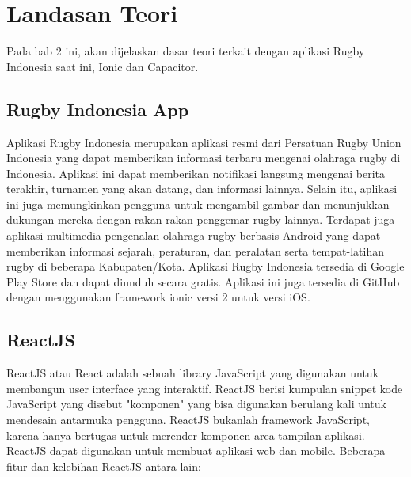 \chapter{Landasan Teori}
\label{chap:teori}

Pada bab 2 ini, akan dijelaskan dasar teori terkait dengan aplikasi Rugby Indonesia saat ini, Ionic dan Capacitor. 

\section{Rugby Indonesia App}
\label{sec:skripsi} 
    Aplikasi Rugby Indonesia merupakan aplikasi resmi dari Persatuan Rugby Union Indonesia yang dapat memberikan informasi terbaru mengenai olahraga rugby di Indonesia. Aplikasi ini dapat memberikan notifikasi langsung mengenai berita terakhir, turnamen yang akan datang, dan informasi lainnya. Selain itu, aplikasi ini juga memungkinkan pengguna untuk mengambil gambar dan menunjukkan dukungan mereka dengan rakan-rakan penggemar rugby lainnya. Terdapat juga aplikasi multimedia pengenalan olahraga rugby berbasis Android yang dapat memberikan informasi sejarah, peraturan, dan peralatan serta tempat-latihan rugby di beberapa Kabupaten/Kota. Aplikasi Rugby Indonesia tersedia di Google Play Store dan dapat diunduh secara gratis. Aplikasi ini juga tersedia di GitHub dengan menggunakan framework ionic versi 2 untuk versi iOS.



\section{ReactJS}
\label{sec:latex}



ReactJS atau React adalah sebuah library JavaScript yang digunakan untuk membangun user interface yang interaktif. ReactJS berisi kumpulan snippet kode JavaScript yang disebut "komponen" yang bisa digunakan berulang kali untuk mendesain antarmuka pengguna. ReactJS bukanlah framework JavaScript, karena hanya bertugas untuk merender komponen area tampilan aplikasi. ReactJS dapat digunakan untuk membuat aplikasi web dan mobile. Beberapa fitur dan kelebihan ReactJS antara lain:

